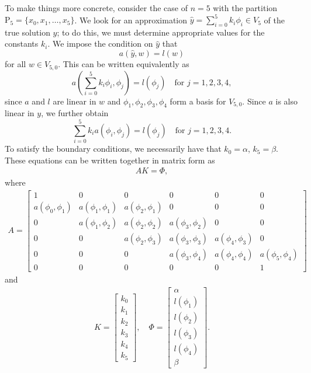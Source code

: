 To make things more concrete, consider the case of \(n=5\) with the partition $\mathrm{P}_5 = \{x_0, x_1, \ldots, x_5\}$.
We look for an approximation $\hat{y} = \sum_{i=0}^5 k_i \phi_i \in V_5$ of the true solution $y$; to do this, we must determine appropriate values for the constants $k_i$.
We impose the condition on $\hat{y}$ that 
\[a(\hat{y},w) = l(w)\]
for all \(w \in V_{5,0}\).
This can be written equivalently as 
\[a \left( \sum_{i=0}^5 k_i \phi_i,\phi_j \right) = l(\phi_j) \quad \text{for } j = 1,2,3,4,\]
since \(a\) and \(l\) are linear in \(w\) and $\phi_1, \phi_2, \phi_3, \phi_4$ form a basis for $V_{5,0}$.
Since $a$ is also linear in \(y\), we further obtain 
\[\sum_{i=0}^5 k_i  a ( \phi_i,\phi_j ) = l(\phi_j) \quad \text{for } j = 1,2,3,4.\]
To satisfy the boundary conditions, we necessarily have that $k_0 = \alpha$, $k_5 = \beta$.
These equations can be written together in matrix form as
\begin{align} AK = \Phi,\label{eqn:FEM_linear_system}\end{align}
where
\begin{align}
A = \left[\begin{array}{cccccc}1 & 0 & 0 & 0 & 0 & 0 \\a(\phi_0,\phi_1) & a(\phi_1,\phi_1) & a(\phi_2,\phi_1) & 0 & 0 & 0 \\0 & a(\phi_1,\phi_2) & a(\phi_2,\phi_2) & a(\phi_3,\phi_2) & 0 & 0 \\0 & 0 & a(\phi_2,\phi_3) & a(\phi_3,\phi_3) & a(\phi_4,\phi_3) & 0 \\0 & 0 & 0 & a(\phi_3,\phi_4) & a(\phi_4,\phi_4) & a(\phi_5,\phi_4) \\0 & 0 & 0 & 0 & 0 &1\end{array}\right]
\label{eqn:FEM:A_matrix}
\end{align}
and
\begin{align}
K = \left[\begin{array}{c}k_0 \\k_1 \\k_2 \\k_3 \\k_4 \\k_5\end{array}\right] , \quad\Phi =  \left[\begin{array}{c}\alpha \\l(\phi_1) \\l(\phi_2) \\l(\phi_3) \\l(\phi_4) \\\beta\end{array}\right].
\label{eqn:FEM:K_Phi_definition}
\end{align}

